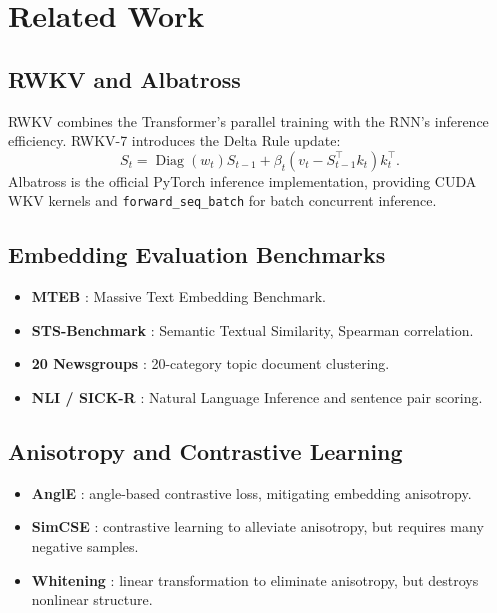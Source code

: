 \documentclass[11pt]{article}
\begin{document}
\section{Related Work}

\subsection{RWKV and Albatross}

RWKV \cite{rwkv7} combines the Transformer's parallel training with the
RNN's inference efficiency. RWKV-7 introduces the Delta Rule update:
\begin{equation}
S_t = \operatorname{Diag}(w_t) S_{t-1} + \beta_t (v_t -
S_{t-1}^{\top} k_t) k_t^{\top}.
\end{equation}
Albatross \cite{albatross} is the official PyTorch inference implementation,
providing CUDA WKV kernels and \texttt{forward\_seq\_batch} for batch
concurrent inference.

\subsection{Embedding Evaluation Benchmarks}

\begin{itemize}
  \item \textbf{MTEB} \cite{mteb}: Massive Text Embedding Benchmark.
  \item \textbf{STS-Benchmark} \cite{stsb}: Semantic Textual Similarity,
  Spearman correlation.
  \item \textbf{20 Newsgroups} \cite{20ng}: 20-category topic document
  clustering.
  \item \textbf{NLI / SICK-R} \cite{sick}: Natural Language Inference and
  sentence pair scoring.
\end{itemize}

\subsection{Anisotropy and Contrastive Learning}

\begin{itemize}
  \item \textbf{AnglE} \cite{angle}: angle-based contrastive loss,
  mitigating embedding anisotropy.
  \item \textbf{SimCSE} \cite{simcse}: contrastive learning to alleviate
  anisotropy, but requires many negative samples.
  \item \textbf{Whitening} \cite{whitening}: linear transformation to
  eliminate anisotropy, but destroys nonlinear structure.
\end{itemize}
\end{document}
